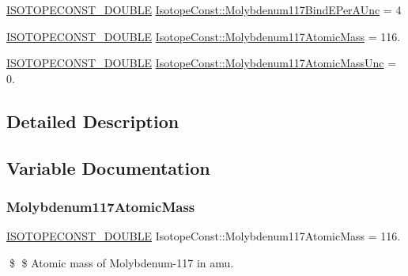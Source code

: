 \begin{DoxyCompactItemize}
\mbox{\hyperlink{group___isotope_const-_macros_ga8f45a7272ce02c0b4c65c44636ed719a}{I\+S\+O\+T\+O\+P\+E\+C\+O\+N\+S\+T\+\_\+\+D\+O\+U\+B\+LE}} \mbox{\hyperlink{group___isotope_const-_molybdenum-_mo117_ga98a3f04ed91c4f144552e1aedfebc881}{Isotope\+Const\+::\+Molybdenum117\+Bind\+E\+Per\+A\+Unc}} = 4
\item 
\mbox{\hyperlink{group___isotope_const-_macros_ga8f45a7272ce02c0b4c65c44636ed719a}{I\+S\+O\+T\+O\+P\+E\+C\+O\+N\+S\+T\+\_\+\+D\+O\+U\+B\+LE}} \mbox{\hyperlink{group___isotope_const-_molybdenum-_mo117_ga898b56b5c1ec2cb40f873e79f59e0fc3}{Isotope\+Const\+::\+Molybdenum117\+Atomic\+Mass}} = 116.
\item 
\mbox{\hyperlink{group___isotope_const-_macros_ga8f45a7272ce02c0b4c65c44636ed719a}{I\+S\+O\+T\+O\+P\+E\+C\+O\+N\+S\+T\+\_\+\+D\+O\+U\+B\+LE}} \mbox{\hyperlink{group___isotope_const-_molybdenum-_mo117_gadfc5f4b719de58ae2a7f400bb669639f}{Isotope\+Const\+::\+Molybdenum117\+Atomic\+Mass\+Unc}} = 0.
\end{DoxyCompactItemize}


\subsection{Detailed Description}


\subsection{Variable Documentation}
\mbox{\label{group___isotope_const-_molybdenum-_mo117_ga898b56b5c1ec2cb40f873e79f59e0fc3}} 
\subsubsection{\texorpdfstring{Molybdenum117\+Atomic\+Mass}{Molybdenum117AtomicMass}}
{\footnotesize\ttfamily \mbox{\hyperlink{group___isotope_const-_macros_ga8f45a7272ce02c0b4c65c44636ed719a}{I\+S\+O\+T\+O\+P\+E\+C\+O\+N\+S\+T\+\_\+\+D\+O\+U\+B\+LE}} Isotope\+Const\+::\+Molybdenum117\+Atomic\+Mass = 116.}

\$ \$ Atomic mass of Molybdenum-\/117 in amu. \mbox{\label{group___isotope_const-_molybdenum-_mo117_gadfc5f4b719de58ae2a7f400bb669639f}} 

